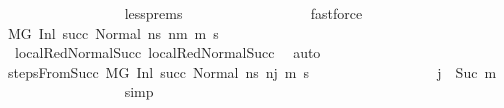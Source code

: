 \begin{isabellebody}
\ \ \ \ \ \ \ \ \ \ \ \ \ \ \ \ \isamarkupfalse%
\ less{\isachardot}{\kern0pt}prems{\isacharparenleft}{\kern0pt}{}{\isacharparenright}{\kern0pt}\isanewline
\ \ \ \ \ \ \ \ \ \ \ \ \ \ \ \ \isamarkupfalse%
\ fastforce\isanewline
\ \ \ \ \ \ \ \ \ \ \ \ \ \ \isamarkupfalse%
\ {\isachardoublequoteopen}M{\isacharcomma}{\kern0pt}{\isasymLambda}{\isacharcomma}{\kern0pt}{\isasymGamma}{\isacharcomma}{\kern0pt}{\isasymOmega}{\isacharcomma}{\kern0pt}G\ {\isasymturnstile}{\isacharparenleft}{\kern0pt}Inl\ succ{\isacharcomma}{\kern0pt}\ Normal\ ns{\isacharprime}{\kern0pt}{\isacharparenright}{\kern0pt}\ {\isacharminus}{\kern0pt}n{\isasymrightarrow}{\isacharcircum}{\kern0pt}m\ {\isacharparenleft}{\kern0pt}m{\isacharprime}{\kern0pt}{\isacharcomma}{\kern0pt}\ s{\isacharprime}{\kern0pt}{\isacharparenright}{\kern0pt}{\isachardoublequoteclose}\isanewline
\ \ \ \ \ \ \ \ \ \ \ \ \ \ \ \ \isamarkupfalse%
\ {\isachardoublequoteopen}{}{\isachardoublequoteclose}{\isacharparenleft}{\kern0pt}{}{\isacharparenright}{\kern0pt}\ local{\isachardot}{\kern0pt}RedNormalSucc{\isacharparenleft}{\kern0pt}{}{\isacharparenright}{\kern0pt}\ local{\isachardot}{\kern0pt}RedNormalSucc{\isacharparenleft}{\kern0pt}{}{\isacharparenright}{\kern0pt}\ \isamarkupfalse%
\ auto\isanewline
\ \ \ \ \ \ \ \ \ \ \ \ \ \ \isamarkupfalse%
\ stepsFromSucc{\isacharcolon}{\kern0pt}\ {\isachardoublequoteopen}M{\isacharcomma}{\kern0pt}{\isasymLambda}{\isacharcomma}{\kern0pt}{\isasymGamma}{\isacharcomma}{\kern0pt}{\isasymOmega}{\isacharcomma}{\kern0pt}G\ {\isasymturnstile}{\isacharparenleft}{\kern0pt}Inl\ succ{\isacharcomma}{\kern0pt}\ Normal\ ns{\isacharprime}{\kern0pt}{\isacharparenright}{\kern0pt}\ {\isacharminus}{\kern0pt}n{\isasymrightarrow}{\isacharcircum}{\kern0pt}{\isacharparenleft}{\kern0pt}j{\isacharminus}{\kern0pt}{}{\isacharparenright}{\kern0pt}\ {\isacharparenleft}{\kern0pt}m{\isacharprime}{\kern0pt}{\isacharcomma}{\kern0pt}\ s{\isacharprime}{\kern0pt}{\isacharparenright}{\kern0pt}{\isachardoublequoteclose}\isanewline
\ \ \ \ \ \ \ \ \ \ \ \ \ \ \ \ \isamarkupfalse%
\ {\isacartoucheopen}j\ {\isacharequal}{\kern0pt}\ Suc\ m{\isacartoucheclose}\isanewline
\ \ \ \ \ \ \ \ \ \ \ \ \ \ \ \ \isamarkupfalse%
\ simp\isanewline
\ \ \ \ \ \ \ \ \ \ \ \ \ \ \isamarkupfalse%

\end{isabellebody}
